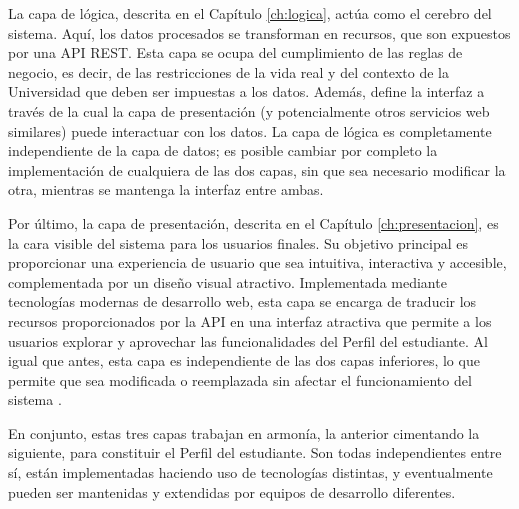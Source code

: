 La capa de lógica, descrita en el Capítulo \ref{ch:logica}, actúa como el cerebro del sistema. Aquí, los datos procesados se transforman en recursos, que son expuestos por una \gls{API REST}. Esta capa se ocupa del cumplimiento de las reglas de negocio, es decir, de las restricciones de la vida real y del contexto de la Universidad que deben ser impuestas a los datos. Además, define la interfaz a través de la cual la capa de presentación (y potencialmente otros servicios web similares) puede interactuar con los datos. La capa de lógica es completamente independiente de la capa de datos; es posible cambiar por completo la implementación de cualquiera de las dos capas, sin que sea necesario modificar la otra, mientras se mantenga la interfaz entre ambas.

Por último, la capa de presentación, descrita en el Capítulo \ref{ch:presentacion}, es la cara visible del sistema para los usuarios finales. Su objetivo principal es proporcionar una experiencia de usuario que sea intuitiva, interactiva y accesible, complementada por un diseño visual atractivo. Implementada mediante tecnologías modernas de desarrollo web, esta capa se encarga de traducir los recursos proporcionados por la API en una interfaz atractiva que permite a los usuarios explorar y aprovechar las funcionalidades del Perfil del estudiante. Al igual que antes, esta capa es independiente de las dos capas inferiores, lo que permite que sea modificada o reemplazada sin afectar el funcionamiento del sistema .

En conjunto, estas tres capas trabajan en armonía, la anterior cimentando la siguiente, para constituir el Perfil del estudiante. Son todas independientes entre sí, están implementadas haciendo uso de tecnologías distintas, y eventualmente pueden ser mantenidas y extendidas por equipos de desarrollo diferentes.